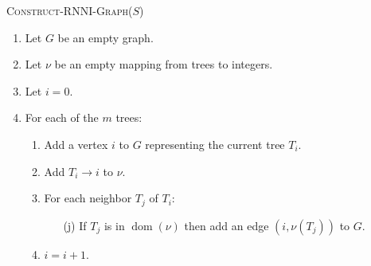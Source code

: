 \documentclass[11pt]{amsart}
\theoremstyle{definition}
\newcommand{\rnni}{\mathrm{RNNI}}
\newcommand{\dom}{\operatorname{dom}}
\begin{document}
\medskip

\textsc{Construct-$\rnni$-Graph($S$)}
\begin{enumerate}[1.]
	\item Let $G$ be an empty graph.
	\item Let $\nu$ be an empty mapping from trees to integers.
	\item Let $i = 0$.
	\item For each of the $m$ trees: \vspace{-0.2em}
		\begin{enumerate}
			\item Add a vertex $i$ to $G$ representing the current tree $T_i$.
			\item Add $T_i \rightarrow i$ to $\nu$.
			\item For each neighbor $T_j$ of $T_i$:
				\begin{enumerate}
					\item[(j)] If $T_j$ is in $\dom(\nu)$ then add an edge $(i, \nu(T_j))$ to $G$.
				\end{enumerate}
		\item $i = i + 1$.
		\end{enumerate}
\end{enumerate}

\iftoggle{curvatureON}{
\section{Some other spaces}

Several important proposal mechanisms used in phylogenetic Bayesian inference by popular software packages such as BEAST2 \autocite{beast2} favor topological moves or tree moves depending on various conditions.
All tree moves we have been considering so far do not make an explicit distinction between topological changes and branch length changes.
To address this issue\todo{issue?}, we consider the following tree move that explicitly allows distributing the acceptance probability between topological and branch length moves.

{\bf Lazy walk.}
Let $p$ be the laziness probability, that is, we do nothing with probability $1-p$ and distribute the probability $p$ as follows.
We decide first on what type of move we want to perform: choose a topological move with probability $q$ and a length move otherwise, that is, $q \leq p$ and the probability of a length move is $p-q$.
The proposal is rejected if a topological move is impossible.

{\bf tau move.}
Choose a coordinate uniformly at random.
Increase the coordinate by $1$ with probability $p$ and decrease it by $1$ otherwise.
If the coordinate becomes $0$, resolve the multifurcation uniformly at random and set the new coordinate to $1$.
Note that this mechanism does not bound edge lengths from above and favors topological moves when $p<1/2$.
}{}
\end{document}
